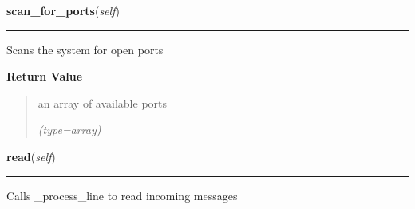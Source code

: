     \label{Serial_conn:Serial_conn:scan_for_ports}

    \vspace{0.5ex}

\hspace{.8\funcindent}\begin{boxedminipage}{\funcwidth}

    \raggedright \textbf{scan\_for\_ports}(\textit{self})

    \vspace{-1.5ex}

    \rule{\textwidth}{0.5\fboxrule}
\setlength{\parskip}{2ex}
    Scans the system for open ports

\setlength{\parskip}{1ex}
      \textbf{Return Value}
    \vspace{-1ex}

      \begin{quote}
      an array of available ports

      {\it (type=array)}

      \end{quote}

    \end{boxedminipage}

    \label{Serial_conn:Serial_conn:read}

    \vspace{0.5ex}

\hspace{.8\funcindent}\begin{boxedminipage}{\funcwidth}

    \raggedright \textbf{read}(\textit{self})

    \vspace{-1.5ex}

    \rule{\textwidth}{0.5\fboxrule}
\setlength{\parskip}{2ex}
    Calls \_process\_line to read incoming messages

\setlength{\parskip}{1ex}
    \end{boxedminipage}

    \label{Serial_conn:Serial_conn:write}

